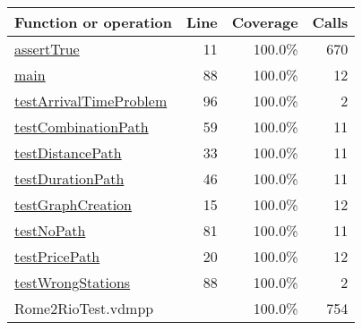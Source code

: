 \bigskip
\begin{longtable}{|l|r|r|r|}
\hline
Function or operation & Line & Coverage & Calls \\
\hline
\hline
\hyperref[assertTrue:11]{assertTrue} & 11&100.0\% & 670 \\
\hline
\hyperref[main:88]{main} & 88&100.0\% & 12 \\
\hline
\hyperref[testArrivalTimeProblem:96]{testArrivalTimeProblem} & 96&100.0\% & 2 \\
\hline
\hyperref[testCombinationPath:59]{testCombinationPath} & 59&100.0\% & 11 \\
\hline
\hyperref[testDistancePath:33]{testDistancePath} & 33&100.0\% & 11 \\
\hline
\hyperref[testDurationPath:46]{testDurationPath} & 46&100.0\% & 11 \\
\hline
\hyperref[testGraphCreation:15]{testGraphCreation} & 15&100.0\% & 12 \\
\hline
\hyperref[testNoPath:81]{testNoPath} & 81&100.0\% & 11 \\
\hline
\hyperref[testPricePath:20]{testPricePath} & 20&100.0\% & 12 \\
\hline
\hyperref[testWrongStations:88]{testWrongStations} & 88&100.0\% & 2 \\
\hline
\hline
Rome2RioTest.vdmpp & & 100.0\% & 754 \\
\hline
\end{longtable}

